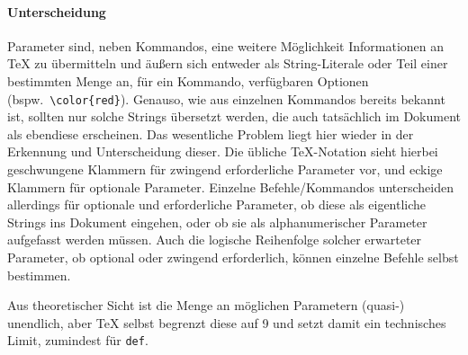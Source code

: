 \paragraph*{Unterscheidung}\par
Parameter sind, neben Kommandos, eine weitere Möglichkeit Informationen an \TeX{} zu übermitteln und äußern sich entweder als String-Literale oder Teil einer bestimmten Menge an, für ein Kommando, verfügbaren Optionen (bspw.\ \verb|\color{red}|). Genauso, wie aus einzelnen Kommandos bereits bekannt ist, sollten nur solche Strings übersetzt werden, die auch tatsächlich im Dokument als ebendiese erscheinen. 
Das wesentliche Problem liegt hier wieder in der Erkennung und Unterscheidung dieser. 
Die übliche \TeX{}-Notation sieht hierbei geschwungene Klammern für zwingend erforderliche Parameter vor, und eckige Klammern für optionale Parameter. 
Einzelne Befehle/Kommandos unterscheiden allerdings für optionale und erforderliche Parameter, ob diese als eigentliche Strings ins Dokument eingehen, oder ob sie als alphanumerischer Parameter aufgefasst werden müssen. 
Auch die logische Reihenfolge solcher erwarteter Parameter, ob optional oder zwingend erforderlich, können einzelne Befehle selbst bestimmen.
\begin{comment}
\footnote{
Ein Parameter eines Befehls wird optional beim Aufrufen des Kommandos, sollte ein initialer/standardmäßiger Wert bei der Deklaration mittels \verb/def/ oder \verb/newcommand/ (und Verwandte) festgelegt worden sein. Dies geschieht innerhalb eckiger Klammern (\texttt{newcommand}), wobei das erste Paar hierbei die Anzahl an Parametern festlegt und jedes folgende mit einer 
\begingroup
    \catcode35=11 
    \#-Nummer
\endgroup
korrespondiert.
}
\end{comment}

Aus theoretischer Sicht ist die Menge an möglichen Parametern (quasi-) unendlich, aber \TeX{} selbst begrenzt diese auf 9 und setzt damit ein technisches Limit, zumindest für \texttt{def}. 


